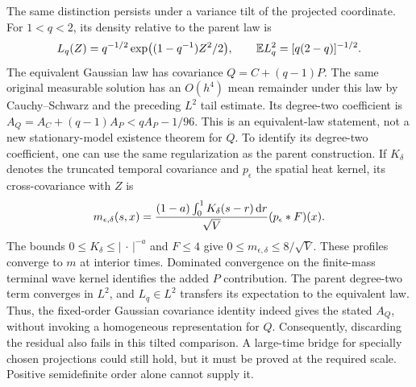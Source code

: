 The same distinction persists under a variance tilt of the projected
coordinate. For $1<q<2$, its density relative to the parent law is
\[
  L_q(Z)=q^{-1/2}\exp\bigl((1-q^{-1})Z^2/2\bigr),\qquad
  \mathbb{E} L_q^2=[q(2-q)]^{-1/2}.
\]
The equivalent Gaussian law has covariance $Q=C+(q-1)P$. The same original
measurable solution has an $O(h^4)$ mean remainder under this law by
Cauchy--Schwarz and the preceding $L^2$ tail estimate. Its degree-two
coefficient is $A_Q=A_C+(q-1)A_P<qA_P-1/96$. This is an equivalent-law
statement, not a new stationary-model existence theorem for $Q$.
To identify its degree-two coefficient, one can use the same regularization
as the parent construction. If $K_\delta$ denotes the truncated temporal
covariance and $p_\epsilon$ the spatial heat kernel, its cross-covariance
with $Z$ is
\[
  m_{\epsilon,\delta}(s,x)
  =\frac{(1-a)\int_0^1K_\delta(s-r)\,\mathrm{d} r}{\sqrt V}
  (p_\epsilon*F)(x).
\]
The bounds $0\le K_\delta\le|\,\cdot\,|^{-a}$ and $F\le4$ give
$0\le m_{\epsilon,\delta}\le8/\sqrt V$. These profiles converge to
$m$ at interior times. Dominated convergence on the finite-mass terminal
wave kernel identifies the added $P$ contribution. The parent degree-two
term converges in $L^2$, and $L_q\in L^2$ transfers its expectation to the
equivalent law. Thus, the fixed-order Gaussian covariance identity indeed
gives the stated $A_Q$, without invoking a homogeneous representation for
$Q$. Consequently, discarding the residual also fails in this tilted comparison.
A large-time bridge for specially chosen projections could still hold,
but it must be proved at the required scale. Positive semidefinite order
alone cannot supply it.
